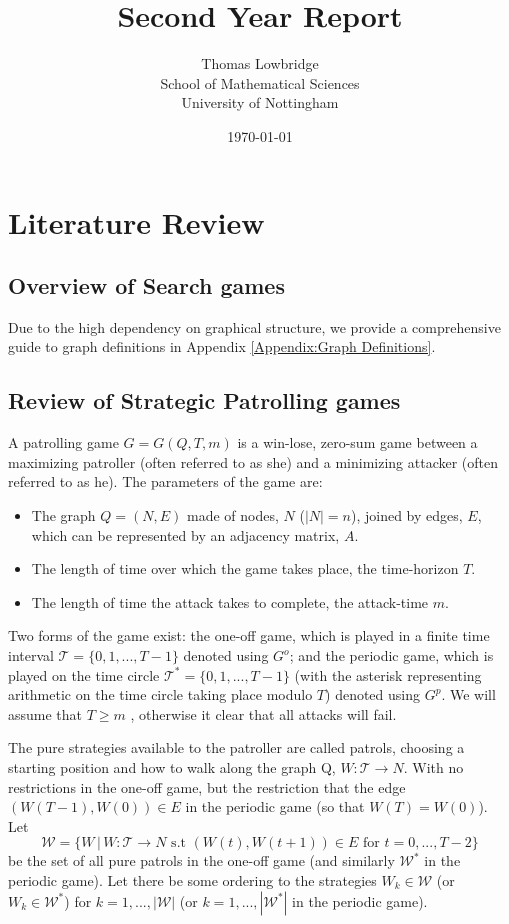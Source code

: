 \documentclass[a4paper,10pt]{article}
\title{Second Year Report}
\date{\today}
\author{Thomas Lowbridge \\ School of Mathematical Sciences \\ University of Nottingham}
\theoremstyle{definition}
\theoremstyle{definition}
\theoremstyle{remark}
\theoremstyle{definition}
\begin{document}
\pagestyle{empty}
{
  \renewcommand{\thispagestyle}[1]{}
  \maketitle
  \tableofcontents  
}
\clearpage
\pagestyle{plain}


\setlength{\parindent}{0pt}
\setlength{\parskip}{1em}

\newpage
{}


\section{Literature Review}
\subsection{Overview of Search games}

Due to the high dependency on graphical structure, we provide a comprehensive guide to graph definitions in Appendix \ref{Appendix:Graph Definitions}.

\subsection{Review of Strategic Patrolling games}
A patrolling game $G=G(Q,T,m)$ is a win-lose, zero-sum game between a maximizing patroller (often referred to as she) and a minimizing attacker (often referred to as he). The parameters of the game are:
\begin{itemize}
\item The graph $Q=(N,E)$ made of nodes, $N$ ($|N|=n$), joined by edges, $E$, which can be represented by an adjacency matrix, $A$.
\item The length of time over which the game takes place, the time-horizon $T$.
\item The length of time the attack takes to complete, the attack-time $m$.
\end{itemize}

Two forms of the game exist: the one-off game, which is played in a finite time interval $\mathcal{T}=\{0,1,...,T-1\}$ denoted using $G^{o}$; and the periodic game, which is played on the time circle $\mathcal{T}^*=\{0,1,...,T-1\}$ (with the asterisk representing arithmetic on the time circle taking place modulo $T$) denoted using $G^p$. We will assume that $T \geq m$ , otherwise it clear that all attacks will fail.

The pure strategies available to the patroller are called patrols, choosing a starting position and how to walk along the graph Q, $W:\mathcal{T} \rightarrow N$. With no restrictions in the one-off game, but the restriction that the edge $(W(T-1),W(0)) \in E$ in the periodic game (so that $W(T)=W(0)$). Let $$\mathcal{W}=\{ W \, | \, W:\mathcal{T} \rightarrow N \text{ s.t } (W(t),W(t+1)) \in E \text{ for } t=0,...,T-2  \} $$ be the set of all pure patrols in the one-off game (and similarly $\mathcal{W}^*$ in the periodic game). Let there be some ordering to the strategies $W_{k} \in \mathcal{W}$ (or $W_{k} \in \mathcal{W}^{*}$) for $k=1,...,|\mathcal{W}|$ (or $k=1,...,|\mathcal{W}^*|$ in the periodic game).
\end{document}
